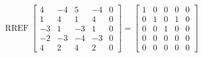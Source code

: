 \begin{exerciseAnswer} 


\[\operatorname{RREF} \left[\begin{array}{cccc|c}
4 & -4 & 5 & -4 & 0 \\
1 & 4 & 1 & 4 & 0 \\
-3 & 1 & -3 & 1 & 0 \\
-2 & -3 & -4 & -3 & 0 \\
4 & 2 & 4 & 2 & 0
\end{array}\right] = \left[\begin{array}{cccc|c}
1 & 0 & 0 & 0 & 0 \\
0 & 1 & 0 & 1 & 0 \\
0 & 0 & 1 & 0 & 0 \\
0 & 0 & 0 & 0 & 0 \\
0 & 0 & 0 & 0 & 0
\end{array}\right] \]



\end{exerciseAnswer}
